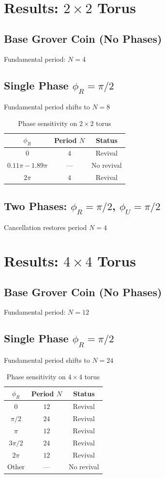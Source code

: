 \documentclass[12pt]{article}
\begin{document}
\section{Results: $2 \times 2$ Torus}

\subsection{Base Grover Coin (No Phases)}
Fundamental period: $N = 4$

\subsection{Single Phase $\phi_R = \pi/2$}
Fundamental period shifts to $N = 8$

\begin{table}[H]
\centering
\caption{Phase sensitivity on $2 \times 2$ torus}
\begin{tabular}{ccc}
\hline
$\phi_R$ & Period $N$ & Status \\
\hline
$0$ & $4$ & Revival \\
$0.11\pi - 1.89\pi$ & --- & No revival \\
$2\pi$ & $4$ & Revival \\
\hline
\end{tabular}
\end{table}

\subsection{Two Phases: $\phi_R = \pi/2$, $\phi_U = \pi/2$}
Cancellation restores period $N = 4$

\section{Results: $4 \times 4$ Torus}

\subsection{Base Grover Coin (No Phases)}
Fundamental period: $N = 12$

\subsection{Single Phase $\phi_R = \pi/2$}
Fundamental period shifts to $N = 24$

\begin{table}[H]
\centering
\caption{Phase sensitivity on $4 \times 4$ torus}
\begin{tabular}{ccc}
\hline
$\phi_R$ & Period $N$ & Status \\
\hline
$0$ & $12$ & Revival \\
$\pi/2$ & $24$ & Revival \\
$\pi$ & $12$ & Revival \\
$3\pi/2$ & $24$ & Revival \\
$2\pi$ & $12$ & Revival \\
Other & --- & No revival \\
\hline
\end{tabular}
\end{table}
\end{document}
